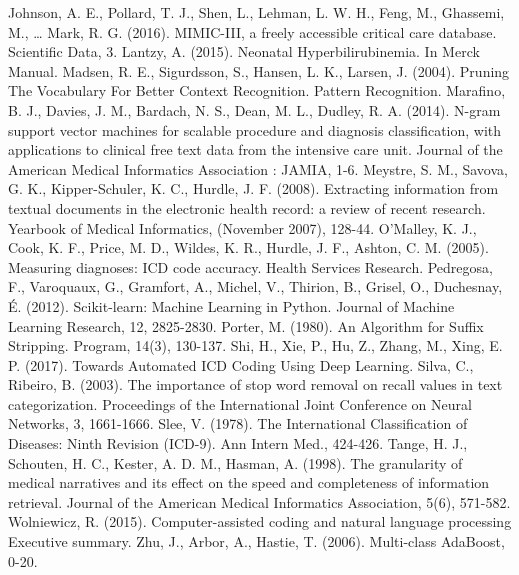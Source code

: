 \documentclass[conference]{IEEEtran}
\begin{document}
\begin{thebibliography}{00}
 Johnson, A. E., Pollard, T. J., Shen, L., Lehman, L. W. H., Feng, M., Ghassemi, M., … Mark, R. G. (2016). MIMIC-III, a freely accessible critical care database. Scientific Data, 3.
 Lantzy, A. (2015). Neonatal Hyperbilirubinemia. In Merck Manual.
 Madsen, R. E., Sigurdsson, S., Hansen, L. K., Larsen, J. (2004). Pruning The Vocabulary For Better Context Recognition. Pattern Recognition.
 Marafino, B. J., Davies, J. M., Bardach, N. S., Dean, M. L., Dudley, R. A. (2014). N-gram support vector machines for scalable procedure and diagnosis classification, with applications to clinical free text data from the intensive care unit. Journal of the American Medical Informatics Association : JAMIA, 1-6.
 Meystre, S. M., Savova, G. K., Kipper-Schuler, K. C., Hurdle, J. F. (2008). Extracting information from textual documents in the electronic health record: a review of recent research. Yearbook of Medical Informatics, (November 2007), 128-44.
 O’Malley, K. J., Cook, K. F., Price, M. D., Wildes, K. R., Hurdle, J. F., Ashton, C. M. (2005). Measuring diagnoses: ICD code accuracy. Health Services Research.
 Pedregosa, F., Varoquaux, G., Gramfort, A., Michel, V., Thirion, B., Grisel, O., Duchesnay, É. (2012). Scikit-learn: Machine Learning in Python. Journal of Machine Learning Research, 12, 2825-2830.
 Porter, M. (1980). An Algorithm for Suffix Stripping. Program, 14(3), 130-137.
 Shi, H., Xie, P., Hu, Z., Zhang, M., Xing, E. P. (2017). Towards Automated ICD Coding Using Deep Learning.
 Silva, C., Ribeiro, B. (2003). The importance of stop word removal on recall values in text categorization. Proceedings of the International Joint Conference on Neural Networks, 3, 1661-1666.
 Slee, V. (1978). The International Classification of Diseases: Ninth Revision (ICD-9). Ann Intern Med., 424-426.
 Tange, H. J., Schouten, H. C., Kester, A. D. M., Hasman, A. (1998). The granularity of medical narratives and its effect on the speed and completeness of information retrieval. Journal of the American Medical Informatics Association, 5(6), 571-582.
 Wolniewicz, R. (2015). Computer-assisted coding and natural language processing Executive summary.
 Zhu, J., Arbor, A., Hastie, T. (2006). Multi-class AdaBoost, 0-20.

\end{thebibliography}
\end{document}
